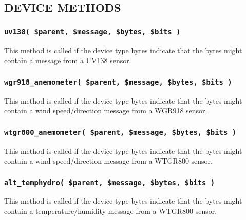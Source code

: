 \subsection*{DEVICE METHODS\label{xPL::RF::Oregon_DEVICE_METHODS}}
\subsubsection*{\texttt{uv138( \$parent, \$message, \$bytes, \$bits )}\label{xPL::RF::Oregon_uv138_parent_message_bytes_bits_}}


This method is called if the device type bytes indicate that the bytes
might contain a message from a UV138 sensor.

\subsubsection*{\texttt{wgr918\_anemometer( \$parent, \$message, \$bytes, \$bits )}\label{xPL::RF::Oregon_wgr918_anemometer_parent_message_bytes_bits_}}


This method is called if the device type bytes indicate that the bytes
might contain a wind speed/direction message from a WGR918 sensor.

\subsubsection*{\texttt{wtgr800\_anemometer( \$parent, \$message, \$bytes, \$bits )}\label{xPL::RF::Oregon_wtgr800_anemometer_parent_message_bytes_bits_}}


This method is called if the device type bytes indicate that the bytes
might contain a wind speed/direction message from a WTGR800 sensor.

\subsubsection*{\texttt{alt\_temphydro( \$parent, \$message, \$bytes, \$bits )}\label{xPL::RF::Oregon_alt_temphydro_parent_message_bytes_bits_}}


This method is called if the device type bytes indicate that the bytes
might contain a temperature/humidity message from a WTGR800 sensor.

